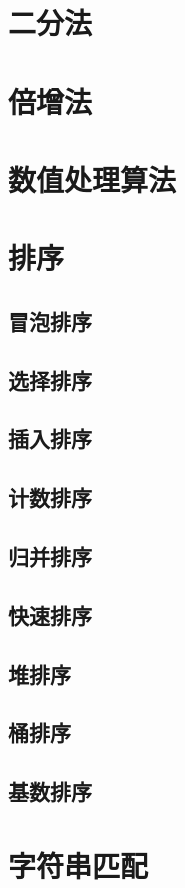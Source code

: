 \documentclass[12pt,twiside,a4paper]{ctexbook}
\numberwithin{chapter}{part}
\begin{document}
\chapter{二分法}

\chapter{倍增法}

\chapter{数值处理算法}

\chapter{排序}
\section{冒泡排序}
\section{选择排序}
\section{插入排序}
\section{计数排序}
\section{归并排序}
\section{快速排序}
\section{堆排序}
\section{桶排序}
\section{基数排序}

\chapter{字符串匹配}
\end{document}
